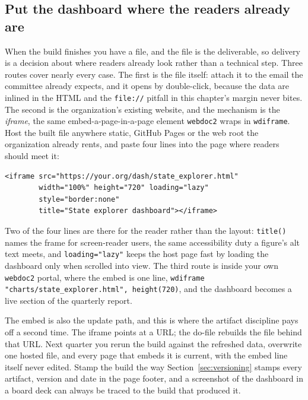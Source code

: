 \documentclass[
    a4paper,
    fontsize=10pt,
    twoside=true,
    numbers=noenddot,
]{kaobook}
\begin{document}
\subsection{Put the dashboard where the readers already are}
When the build finishes you have a file, and the file is the deliverable, so delivery is a decision about where readers already look rather than a technical step. Three routes cover nearly every case. The first is the file itself: attach it to the email the committee already expects, and it opens by double-click, because the data are inlined in the HTML and the \texttt{file://} pitfall in this chapter's margin never bites. The second is the organization's existing website, and the mechanism is the \emph{iframe}, the same embed-a-page-in-a-page element \texttt{webdoc2} wraps in \texttt{wdiframe}. Host the built file anywhere static, GitHub Pages or the web root the organization already rents, and paste four lines into the page where readers should meet it:
\par
{\footnotesize
\begin{verbatim}
<iframe src="https://your.org/dash/state_explorer.html"
        width="100%" height="720" loading="lazy"
        style="border:none"
        title="State explorer dashboard"></iframe>
\end{verbatim}
}
Two of the four lines are there for the reader rather than the layout: \texttt{title()} names the frame for screen-reader users, the same accessibility duty a figure's alt text meets, and \texttt{loading="lazy"} keeps the host page fast by loading the dashboard only when scrolled into view. The third route is inside your own \texttt{webdoc2} portal, where the embed is one line, \texttt{wdiframe "charts/state\_explorer.html", height(720)}, and the dashboard becomes a live section of the quarterly report.

The embed is also the update path, and this is where the artifact discipline pays off a second time. The iframe points at a URL; the do-file rebuilds the file behind that URL. Next quarter you rerun the build against the refreshed data, overwrite one hosted file, and every page that embeds it is current, with the embed line itself never edited. Stamp the build the way Section~\ref{sec:versioning} stamps every artifact, version and date in the page footer, and a screenshot of the dashboard in a board deck can always be traced to the build that produced it.
\end{document}
